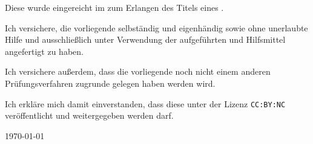 \thispagestyle{empty}
Diese  wurde eingereicht im  zum Erlangen des Titels eines . 

Ich versichere, die vorliegende  selbständig und eigenhändig sowie ohne unerlaubte Hilfe und ausschließlich unter Verwendung der aufgeführten  und Hilfsmittel angefertigt zu haben. 

Ich versichere außerdem, dass die vorliegende  noch nicht einem anderen Prüfungsverfahren zugrunde gelegen haben werden wird.

Ich erkläre mich damit einverstanden, dass diese  unter der Lizenz \texttt{CC:BY:NC } veröffentlicht und weitergegeben werden darf.


\hfill {} \today\par
\hfill {}